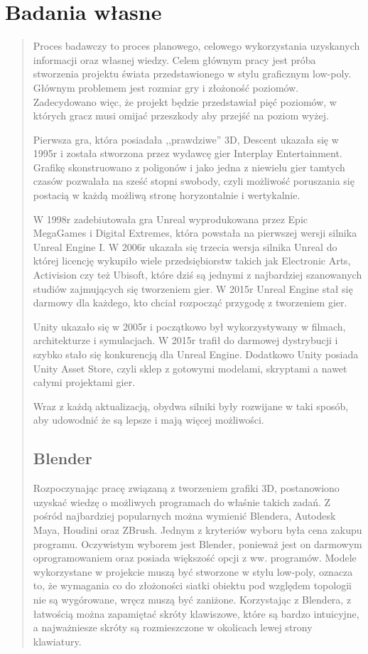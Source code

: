 \chapter{Badania własne}
\begin{quotation}
\indent Proces badawczy to proces planowego, celowego wykorzystania uzyskanych informacji oraz własnej wiedzy. Celem głównym pracy jest próba stworzenia projektu świata przedstawionego w stylu graficznym low-poly. Głównym problemem jest rozmiar gry i złożoność poziomów. Zadecydowano więc, że projekt będzie przedstawiał pięć poziomów, w których gracz musi omijać przeszkody aby przejść na poziom wyżej.

\indent Pierwsza gra, która posiadała ,,prawdziwe'' 3D, Descent ukazała się w 1995r i została stworzona przez wydawcę gier Interplay Entertainment. Grafikę skonstruowano z poligonów i jako jedna z niewielu gier tamtych czasów pozwalała na sześć stopni swobody, czyli możliwość poruszania się postacią w każdą możliwą stronę horyzontalnie i wertykalnie.

\indent W 1998r zadebiutowała gra Unreal wyprodukowana przez Epic MegaGames i Digital Extremes, która powstała na pierwszej wersji silnika Unreal Engine I. W 2006r ukazała się trzecia wersja silnika Unreal do której licencję wykupiło wiele przedsiębiorstw takich jak Electronic Arts, Activision czy też Ubisoft, które dziś są jednymi z najbardziej szanowanych studiów zajmujących się tworzeniem gier. W 2015r Unreal Engine stał się darmowy dla każdego, kto chciał rozpocząć przygodę z tworzeniem gier.

\newpage
\indent Unity ukazało się w 2005r i początkowo był wykorzystywany w filmach, architekturze i symulacjach. W 2015r trafił do darmowej dystrybucji i szybko stało się konkurencją dla Unreal Engine. Dodatkowo Unity posiada Unity Asset Store, czyli sklep z gotowymi modelami, skryptami a nawet całymi projektami gier.

\indent Wraz z każdą aktualizacją, obydwa silniki były rozwijane w taki sposób, aby udowodnić że są lepsze i mają więcej możliwości.
\section{Blender}

\indent Rozpoczynając pracę związaną z tworzeniem grafiki 3D, postanowiono uzyskać wiedzę o możliwych programach do właśnie takich zadań. Z pośród najbardziej popularnych można wymienić Blendera, Autodesk Maya, Houdini oraz ZBrush. Jednym z kryteriów wyboru była cena zakupu programu. Oczywistym wyborem jest Blender, ponieważ jest on darmowym oprogramowaniem oraz posiada większość opcji z ww. programów. Modele wykorzystane w projekcie muszą być stworzone w stylu low-poly, oznacza to, że wymagania co do złożoności siatki obiektu pod względem topologii nie są wygórowane, wręcz muszą być zaniżone. Korzystając z Blendera, z łatwością można zapamiętać skróty klawiszowe, które są bardzo intuicyjne, a najważniesze skróty są rozmieszczone w okolicach lewej strony klawiatury. 

\end{quotation}
